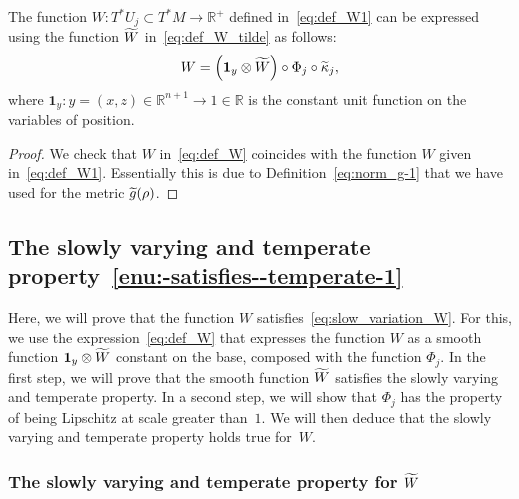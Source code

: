 \documentclass[AHL,Unicode,longabstracts,published]{cedram}
\newcommand{\bbR}{\mathbb{R}}
\let\oldtilde\tilde
\renewcommand*{\tilde}[1]{\mathchoice{\widetilde{#1}}{\widetilde{#1}}{\oldtilde{#1}}{\oldtilde{#1}}}
\newcommand{\bbR}{\mathbb{R}}
\begin{document}

\begin{cBoxB}{}
\begin{lemm}
The function $W:T^{*}U_{j}\subset T^{*}M\rightarrow\bbR^{+}$ defined in~\eqref{eq:def_W1} can be expressed using the function $\tilde{W}$ in~\eqref{eq:def_W_tilde} as follows:
\begin{equation}\label{eq:def_W}
W=\left(\boldsymbol{1}_{y}\otimes\tilde{W}\right)\circ\Phi_{j}\circ\tilde{\kappa}_{j},
\end{equation}
where $\boldsymbol{1}_{y}:y=(x,z)\in\bbR^{n+1}\rightarrow1\in\bbR$ is the constant unit function on the variables of position.
\end{lemm}
\end{cBoxB}

\begin{proof}
We check that $W$ in~\eqref{eq:def_W} coincides with the function $W$ given in~\eqref{eq:def_W1}. Essentially this is due to Definition~\eqref{eq:norm_g-1} that we have used for the metric $\tilde{g}(\rho)$.
\end{proof}

\subsection{The slowly varying and temperate property~\eqref{enu:-satisfies--temperate-1}}

Here, we will prove that the function $W$ satisfies~\eqref{eq:slow_variation_W}. For this, we use the expression~\eqref{eq:def_W} that expresses the function $W$ as a smooth function $\boldsymbol{1}_{y}\otimes\tilde{W}$ constant on the base, composed with the function $\Phi_{j}$. In the first step, we will prove that the smooth function $\tilde{W}$ satisfies the slowly varying and temperate property. In a second step, we will show that $\Phi_{j}$ has the property of being Lipschitz at scale greater than~$1$. We will then deduce that the slowly varying and temperate property holds true for~$W$.

\subsubsection{The slowly varying and temperate property for \texorpdfstring{$\tilde{W}$}{W}}
\end{document}
